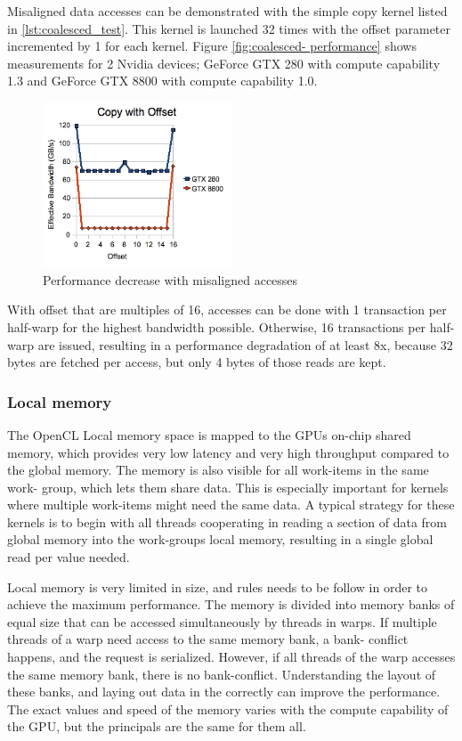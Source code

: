 Misaligned data accesses can be demonstrated with the simple copy kernel
listed in \ref{lst:coalesced_test}. This kernel is launched 32 times with the
offset parameter incremented by 1 for each kernel. Figure \ref{fig:coalesced-
performance} shows measurements for 2 Nvidia devices; GeForce GTX 280 with
compute capability 1.3 and GeForce GTX 8800 with compute capability 1.0.

\begin{figure}[h]
  \centering
  \includegraphics[width=0.5\textwidth]{images/coalesced-performance.png}
  \caption{Performance decrease with misaligned accesses}
  \label{fig:coalesced-performance}
\end{figure}

With offset that are multiples of 16, accesses can be done with 1 transaction
per half-warp for the highest bandwidth possible. Otherwise, 16 transactions
per half-warp are issued, resulting in a performance degradation of at least
8x, because 32 bytes are fetched per access, but only 4 bytes of those reads
are kept.

\subsubsection{Local memory}
\label{sect:local-mem-optimization}

The OpenCL Local memory space is mapped to the GPUs on-chip shared memory,
which provides very low latency and very high throughput compared to the
global memory. The memory is also visible for all work-items in the same work-
group, which lets them share data. This is especially important for kernels
where multiple work-items might need the same data. A typical strategy for
these kernels is to begin with all threads cooperating in reading a section of
data from global memory into the work-groups local memory, resulting in a
single global read per value needed.

Local memory is very limited in size, and rules needs to be follow in order to
achieve the maximum performance. The memory is divided into memory banks of
equal size that can be accessed simultaneously by threads in warps. If
multiple threads of a warp need access to the same memory bank, a bank-
conflict happens, and the request is serialized. However, if all threads of
the warp accesses the same memory bank, there is no bank-conflict.
Understanding the layout of these banks, and laying out data in the correctly
can improve the performance. The exact values and speed of the memory varies
with the compute capability of the GPU, but the principals are the same for
them all.

